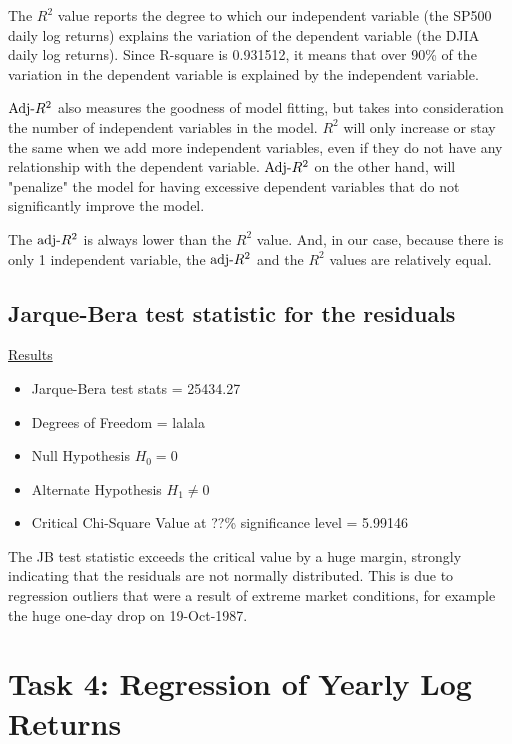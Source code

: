 \documentclass[a4paper]{article}
\begin{document}
	The $R^2$ value reports the degree to which our independent variable (the SP500 daily log returns) explains the variation of the dependent variable (the DJIA daily log returns). Since R-square is 0.931512, it means that over 90\% of the variation in the dependent variable is explained by the independent variable.
	
	$\textnormal{Adj-}R^2$ also measures the goodness of model fitting, but takes into consideration the number of independent variables in the model. $R^2$ will only increase or  stay the same when we add more independent variables, even if they do not have any relationship with the dependent variable. $\textnormal{Adj-}R^2$ on the other hand, will "penalize" the model for having excessive dependent variables that do not significantly improve the model. 
	
	The $\textnormal{adj-}R^2$ is always lower than the $R^2$ value. And, in our case, because there is only 1 independent variable, the $\textnormal{adj-}R^2$ and the $R^2$ values are relatively equal.
	
	\subsection{Jarque-Bera test statistic for the residuals}
	\underline{Results}
	\begin{itemize}[nosep]
		\item Jarque-Bera test stats = 25434.27
		\item Degrees of Freedom = lalala
		\item Null Hypothesis $H_0 = 0$
		\item Alternate Hypothesis $H_1 \ne 0$
		\item Critical Chi-Square Value at  ??\% significance level = 5.99146
	\end{itemize}
	
	The JB test statistic exceeds the critical value by a huge margin, strongly indicating that the residuals are not normally distributed. This is due to regression outliers that were a result of extreme market conditions, for example the huge one-day drop on 19-Oct-1987. 
	
	\begin{comment}
	The JB test's null hypothesis is JB = 0. If the null hypothesis is not rejected, it indicates that the
	distribution of the errors are normally distributed (under a certain level of significance).
	\end{comment}
	
	\section*{Task 4: Regression of Yearly Log Returns}
	\label{sec:num2}
	
\end{document}

